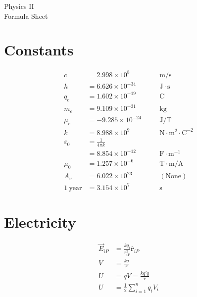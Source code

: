\documentclass[10pt]{article}
\newcommand{\scinot}[2]{\ensuremath{#1 \times 10^{#2}}}
\begin{document}
\raggedleft
\footnotesize
\begin{multicols*}{5}

\setlength{\premulticols}{1pt}
\setlength{\postmulticols}{1pt}
\setlength{\multicolsep}{1pt}
\setlength{\columnsep}{2pt}

\begin{center}
    \Large
    Physics \textrm{II} \\
    Formula Sheet
\end{center}

\section{Constants}

\begin{alignat*}{2}
    c   &= \scinot{2.998}{8}   && \quad \mathrm{m / s}\\
    h   &= \scinot{6.626}{-34} && \quad \mathrm{J \cdot s}\\
    q_e &= \scinot{1.602}{-19} && \quad \mathrm{C}\\
    m_e &= \scinot{9.109}{-31} && \quad \mathrm{kg}\\
    \mu_e &= \scinot{-9.285}{-24} && \quad \mathrm{J/T}\\
    k   &= \scinot{8.988}{9}   && \quad \mathrm{N \cdot m^2 \cdot
    C^{-2}}\\
    \varepsilon_0 &= \frac{1}{4\pi k} \\
        &= \scinot{8.854}{-12} && \quad \mathrm{F \cdot m^{-1}}\\
	\mu_0 &= \scinot{1.257}{-6} && \quad \mathrm{T \cdot m/A}\\
    A_v &= \scinot{6.022}{23} && \quad (\text{None})\\
    1 \: \text{year} &= \scinot{3.154}{7} && \quad \mathrm{s}
\end{alignat*}

\section{Electricity}

\begin{align*}
    \vec{E}_{iP} &= \frac{kq_i}{r_{iP}^2} \hat{\mathbf{r}}_{iP}\\
    V &= \frac{kq}{r}\\
    U &= qV = \frac{kq'q}{r}\\
    U &= \frac{1}{2} \sum_{i=1}^n q_i V_i
\end{align*}


\end{multicols*}
\end{document}
